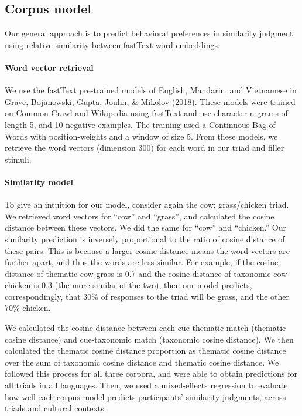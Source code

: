 \documentclass[10pt, letterpaper]{article}
\begin{document}
\hypertarget{corpus-model}{%
\subsection{Corpus model}\label{corpus-model}}

Our general approach is to predict behavioral preferences in similarity
judgment using relative similarity between fastText word embeddings.

\hypertarget{word-vector-retrieval}{%
\paragraph{Word vector retrieval}\label{word-vector-retrieval}}

We use the fastText pre-trained models of English, Mandarin, and
Vietnamese in Grave, Bojanowski, Gupta, Joulin, \& Mikolov (2018). These
models were trained on Common Crawl and Wikipedia using fastText and use
character n-grams of length 5, and 10 negative examples. The training
used a Continuous Bag of Words with position-weights and a window of
size 5. From these models, we retrieve the word vectors (dimension 300)
for each word in our triad and filler stimuli.

\hypertarget{similarity-model}{%
\paragraph{Similarity model}\label{similarity-model}}

To give an intuition for our model, consider again the cow:
grass/chicken triad. We retrieved word vectors for ``cow'' and
``grass'', and calculated the cosine distance between these vectors. We
did the same for ``cow'' and ``chicken.'' Our similarity prediction is
inversely proportional to the ratio of cosine distance of these pairs.
This is because a larger cosine distance means the word vectors are
further apart, and thus the words are less similar. For example, if the
cosine distance of thematic cow-grass is 0.7 and the cosine distance of
taxonomic cow-chicken is 0.3 (the more similar of the two), then our
model predicts, correspondingly, that 30\% of responses to the triad
will be grass, and the other 70\% chicken.

We calculated the cosine distance between each cue-thematic match
(thematic cosine distance) and cue-taxonomic match (taxonomic cosine
distance). We then calculated the thematic cosine distance proportion as
thematic cosine distance over the sum of taxonomic cosine distance and
thematic cosine distance. We followed this process for all three
corpora, and were able to obtain predictions for all triads in all
languages. Then, we used a mixed-effects regression to evaluate how well
each corpus model predicts participants' similarity judgments, across
triads and cultural contexts.
\end{document}
